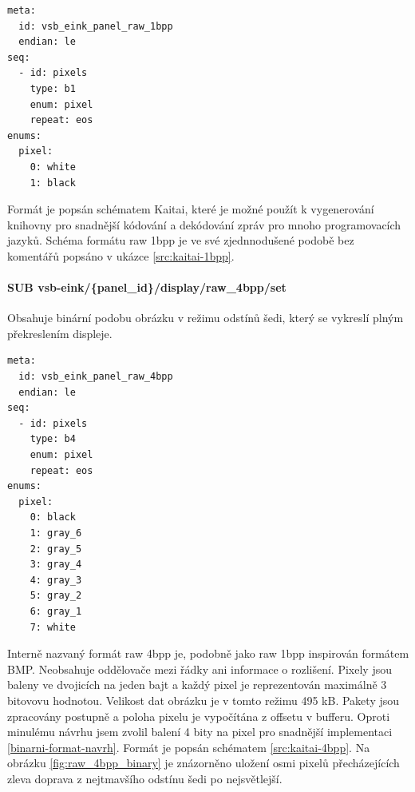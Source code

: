 \begin{lstlisting}[label=src:kaitai-1bpp,caption={Kaitai schéma formátu raw 1bpp}]
meta:
  id: vsb_eink_panel_raw_1bpp
  endian: le
seq:
  - id: pixels
    type: b1
    enum: pixel
    repeat: eos
enums:
  pixel:
    0: white
    1: black
\end{lstlisting}

Formát je popsán schématem Kaitai\cite{KaitaiioKaitai_struct2024}, které je možné použít k vygenerování knihovny pro snadnější kódování a dekódování zpráv pro mnoho programovacích jazyků. Schéma formátu raw 1bpp je ve své zjednnodušené podobě bez komentářů popsáno v ukázce \ref{src:kaitai-1bpp}.

\paragraph*{SUB vsb-eink/\{panel\_id\}/display/raw\_4bpp/set}
Obsahuje binární podobu obrázku v režimu odstínů šedi, který se vykreslí plným překreslením displeje.

\begin{lstlisting}[label=src:kaitai-4bpp,caption={Kaitai schéma formátu raw 4bpp}]
meta:
  id: vsb_eink_panel_raw_4bpp
  endian: le
seq:
  - id: pixels
    type: b4
    enum: pixel
    repeat: eos
enums:
  pixel:
    0: black
    1: gray_6
    2: gray_5
    3: gray_4
    4: gray_3
    5: gray_2
    6: gray_1
    7: white
\end{lstlisting}

Interně nazvaný formát raw 4bpp je, podobně jako raw 1bpp inspirován formátem BMP. Neobsahuje oddělovače mezi řádky ani informace o rozlišení. Pixely jsou baleny ve dvojicích na jeden bajt a každý pixel je reprezentován maximálně 3 bitovovu hodnotou. Velikost dat obrázku je v tomto režimu 495 kB. Pakety jsou zpracovány postupně a poloha pixelu je vypočítána z offsetu v bufferu. Oproti minulému návrhu jsem zvolil balení 4 bity na pixel pro snadnější implementaci \ref{binarni-format-navrh}. Formát je popsán schématem \ref{src:kaitai-4bpp}. Na obrázku \ref{fig:raw_4bpp_binary} je znázorněno uložení osmi pixelů přecházejících zleva doprava z nejtmavšího odstínu šedi po nejsvětlejší.

